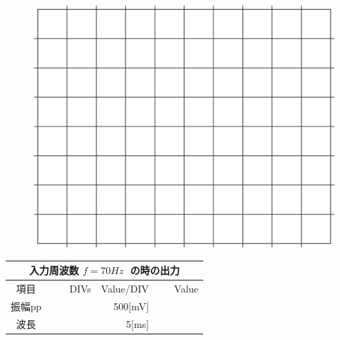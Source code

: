 \documentclass[uplatex,a4paper,11pt,oneside,openany]{jsbook}
\begin{document}
\begin{multicols}{2}
  \begin{figure}[H]
     \centering
      \includegraphics[keepaspectratio, scale=0.28, angle=0]
                  {figs/eps/grid.eps}
                  \label{fig:grid40mV}
  \end{figure}

  \begin{spacing}{1.5}
  \begin{tabular}{|c||r|r|r|}
    \multicolumn{4}{c}{入力周波数 $f=70Hz\;$ の時の出力} \\ \hline
    項目 & DIVs & Value/DIV & Value \\ \hline \hline
    振幅pp & 　　　　 & 500[mV]& 　　　　 \\ \hline
    波長 & 　　　　 & 5[ms]& 　　　　 \\ \hline
  \end{tabular}
\end{spacing}
\end{multicols}

\vfill
\end{document}
